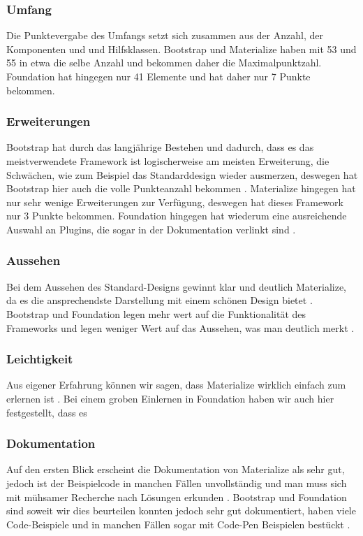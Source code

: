 \subsubsection{Umfang}
Die Punktevergabe des Umfangs setzt sich zusammen aus der Anzahl, der Komponenten und und Hilfsklassen. Bootstrap und Materialize haben mit 53 und 55 in etwa die selbe Anzahl und bekommen daher die Maximalpunktzahl\cite{bootstrap-docu,materialize-docu,foundation-docu}. Foundation hat hingegen nur 41 Elemente und hat daher nur 7 Punkte bekommen.
\subsubsection{Erweiterungen}
Bootstrap hat durch das langjährige Bestehen und dadurch, dass es das meistverwendete Framework ist logischerweise am meisten Erweiterung, die Schwächen, wie zum Beispiel das Standarddesign wieder ausmerzen, deswegen hat Bootstrap hier auch die volle Punkteanzahl bekommen \cite{introduction-bootstrap}. Materialize hingegen hat nur sehr wenige Erweiterungen zur Verfügung, deswegen hat dieses Framework nur 3 Punkte bekommen. Foundation hingegen hat wiederum eine ausreichende Auswahl an Plugins, die sogar in der Dokumentation verlinkt sind \cite{foundation-docu}. 
\subsubsection{Aussehen}
Bei dem Aussehen des Standard-Designs gewinnt klar und deutlich Materialize, da es die ansprechendste Darstellung mit einem schönen Design bietet \cite{materialize-docu}. Bootstrap und Foundation legen mehr wert auf die Funktionalität des Frameworks und legen weniger Wert auf das Aussehen, was man deutlich merkt \cite{bootstrap-docu, foundation-docu}.
\subsubsection{Leichtigkeit}
Aus eigener Erfahrung können wir sagen, dass Materialize wirklich einfach zum erlernen ist \cite{materialize-docu}. Bei einem groben Einlernen in Foundation haben wir auch hier festgestellt, dass es 
\subsubsection{Dokumentation}
Auf den ersten Blick erscheint die Dokumentation von Materialize als sehr gut, jedoch ist der Beispielcode in manchen Fällen unvollständig und man muss sich mit mühsamer Recherche nach Lösungen erkunden \cite{materialize-docu}. Bootstrap und Foundation sind soweit wir dies beurteilen konnten jedoch sehr gut dokumentiert, haben viele Code-Beispiele und in manchen Fällen sogar mit Code-Pen Beispielen bestückt \cite{bootstrap-docu, foundation-docu}.

